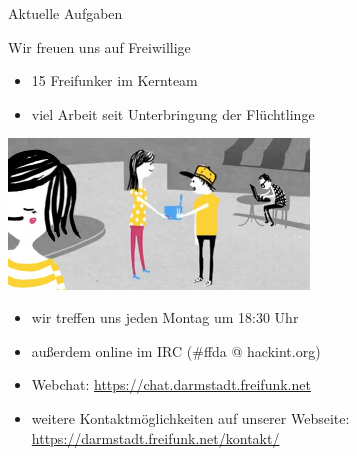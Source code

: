\documentclass[10pt]{beamer}
\begin{document}
\begin{frame}{Aktuelle Aufgaben}
    \end{frame}

    \begin{frame}{Wir freuen uns auf Freiwillige}
      \begin{itemize}
        \item 15 Freifunker im Kernteam
        \item viel Arbeit seit Unterbringung der Flüchtlinge
      \end{itemize}
      \vfill
      \hspace{2em}\includegraphics[width=0.6\textwidth]{images/router}
      \vfill
      \begin{itemize}
        \pause
        \item wir treffen uns jeden Montag um 18:30 Uhr
        \item außerdem online im IRC (\#ffda @ hackint.org)
        \item Webchat: \url{https://chat.darmstadt.freifunk.net}
        \item weitere Kontaktmöglichkeiten auf unserer Webseite:\\
        \url{https://darmstadt.freifunk.net/kontakt/}
      \end{itemize}
    \end{frame}
\end{document}
